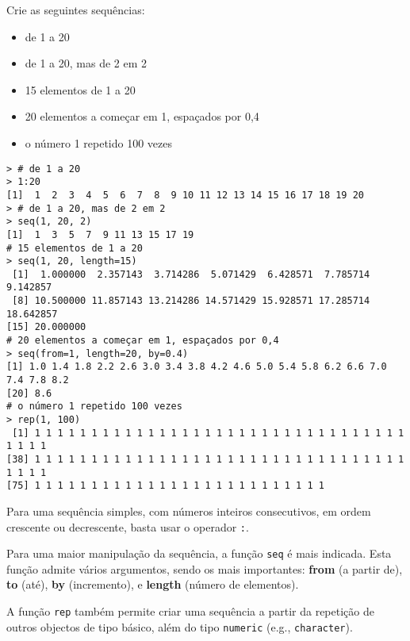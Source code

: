 \documentclass{exam}
\begin{document}
\begin{questions}
\question Crie as seguintes sequências:
\begin{itemize}
\item de 1 a 20
\item de 1 a 20, mas de 2 em 2
\item 15 elementos de 1 a 20
\item 20 elementos a começar em 1, espaçados por 0,4
\item o número 1 repetido 100 vezes
\end{itemize}
\begin{solution}
	\begin{verbatim}
> # de 1 a 20
> 1:20
[1]  1  2  3  4  5  6  7  8  9 10 11 12 13 14 15 16 17 18 19 20
> # de 1 a 20, mas de 2 em 2
> seq(1, 20, 2)
[1]  1  3  5  7  9 11 13 15 17 19
# 15 elementos de 1 a 20
> seq(1, 20, length=15)
 [1]  1.000000  2.357143  3.714286  5.071429  6.428571  7.785714  9.142857
 [8] 10.500000 11.857143 13.214286 14.571429 15.928571 17.285714 18.642857
[15] 20.000000
# 20 elementos a começar em 1, espaçados por 0,4
> seq(from=1, length=20, by=0.4)
[1] 1.0 1.4 1.8 2.2 2.6 3.0 3.4 3.8 4.2 4.6 5.0 5.4 5.8 6.2 6.6 7.0 7.4 7.8 8.2
[20] 8.6
# o número 1 repetido 100 vezes
> rep(1, 100)
 [1] 1 1 1 1 1 1 1 1 1 1 1 1 1 1 1 1 1 1 1 1 1 1 1 1 1 1 1 1 1 1 1 1 1 1 1 1 1
[38] 1 1 1 1 1 1 1 1 1 1 1 1 1 1 1 1 1 1 1 1 1 1 1 1 1 1 1 1 1 1 1 1 1 1 1 1 1
[75] 1 1 1 1 1 1 1 1 1 1 1 1 1 1 1 1 1 1 1 1 1 1 1 1 1 1
	\end{verbatim}
	Para uma sequência simples, com números inteiros consecutivos, em ordem crescente ou decrescente, basta usar o operador \texttt{:}.
	
	Para uma maior manipulação da sequência, a função \texttt{seq} é mais indicada. Esta função admite vários argumentos, sendo os mais importantes:
	\textbf{from} (a partir de), \textbf{to} (até), \textbf{by} (incremento), e \textbf{length} (número de elementos).
	
	A função \texttt{rep} também permite criar uma sequência a partir da repetição de outros objectos de tipo básico, além do tipo \texttt{numeric} (e.g., \texttt{character}).
\end{solution}


\end{questions}
\end{document}
